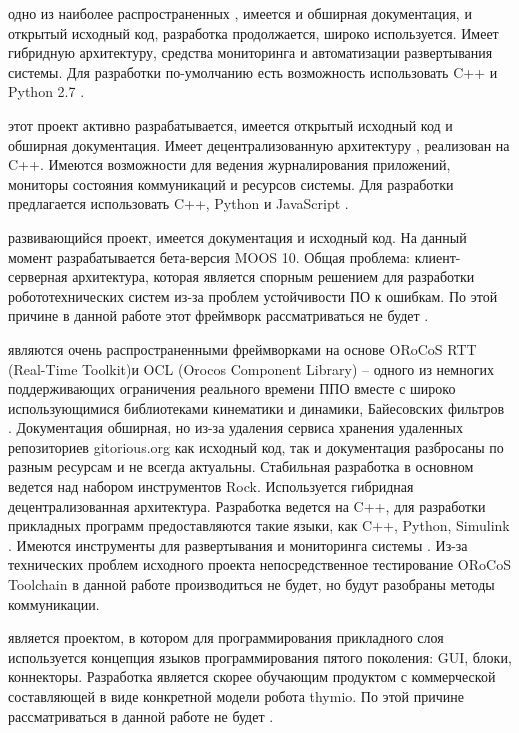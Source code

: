 \begin{description}[noitemsep]
	\item [ROS] одно из наиболее распространенных \marm{}, имеется и обширная документация, и открытый исходный код, разработка продолжается, широко используется. Имеет гибридную архитектуру, средства мониторинга и автоматизации развертывания системы. Для разработки по-умолчанию есть возможность использовать C++ и Python 2.7 \cite{ros-main-site}.

	\item[MIRA] этот проект активно разрабатывается, имеется открытый исходный код и обширная документация. Имеет децентрализованную архитектуру \cite{einhorn2012mira}, реализован на C++. Имеются возможности для ведения журналирования приложений, мониторы состояния коммуникаций и ресурсов системы. Для разработки предлагается использовать C++, Python и JavaScript \cite{mira-main-site}.

	\item [MOOS] развивающийся проект, имеется документация и исходный код. На данный момент разрабатывается бета-версия MOOS 10. Общая проблема: клиент-серверная архитектура, которая является спорным решением для разработки робототехнических систем из-за проблем устойчивости ПО к ошибкам. По этой причине в данной работе этот фреймворк рассматриваться не будет \cite{moos-main-site}.
		
	\item [ORoCoS Toolchain и Rock] являются очень распространенными фреймворками на основе ORoCoS RTT (Real-Time Toolkit)и OCL (Orocos Component Library) -- одного из немногих поддерживающих ограничения реального времени ППО вместе с широко использующимися библиотеками кинематики и динамики, Байесовских фильтров \etc. Документация обширная, но из-за удаления сервиса хранения удаленных репозиториев gitorious.org \cite{gitorious-valhala} как исходный код, так и документация разбросаны по разным ресурсам и не всегда актуальны. Стабильная разработка в основном ведется над набором инструментов Rock. Используется гибридная децентрализованная архитектура. Разработка ведется на C++, для разработки прикладных программ предоставляются такие языки, как C++, Python, Simulink \cite{blasco2012multiagent}. Имеются инструменты для развертывания и мониторинга системы \cite{orocos-toolchain-main-site,rock-main-site}. Из-за технических проблем исходного проекта непосредственное тестирование ORoCoS Toolchain в данной работе производиться не будет, но будут разобраны методы коммуникации.
	
	\item [ASEBA] является проектом, в котором для программирования прикладного слоя используется концепция языков программирования пятого поколения: GUI, блоки, коннекторы. Разработка является скорее обучающим продуктом с коммерческой составляющей в виде конкретной модели робота thymio. По этой причине рассматриваться в данной работе не будет \cite{aseba-main-site}.
	

\end{description}
